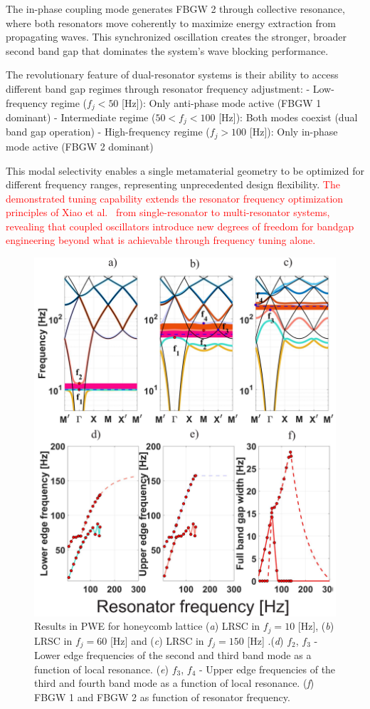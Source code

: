 \documentclass[review,numbers,sort&compress]{elsarticle}
\begin{document}
The in-phase coupling mode generates FBGW 2 through collective resonance, where both resonators move coherently to maximize energy extraction from propagating waves. This synchronized oscillation creates the stronger, broader second band gap that dominates the system's wave blocking performance.

The revolutionary feature of dual-resonator systems is their ability to access different band gap regimes through resonator frequency adjustment:
- Low-frequency regime ($f_j < 50$ [Hz]): Only anti-phase mode active (FBGW 1 dominant)
- Intermediate regime ($50 < f_j < 100$ [Hz]): Both modes coexist (dual band gap operation)
- High-frequency regime ($f_j > 100$ [Hz]): Only in-phase mode active (FBGW 2 dominant)

This modal selectivity enables a single metamaterial geometry to be optimized for different frequency ranges, representing unprecedented design flexibility. \textcolor{red}{The demonstrated tuning capability extends the resonator frequency optimization principles of Xiao et al.~\cite{Xiao_2012} from single-resonator to multi-resonator systems, revealing that coupled oscillators introduce new degrees of freedom for bandgap engineering beyond what is achievable through frequency tuning alone.}
\newpage
\begin{figure}[htb]
	\centering
	\includegraphics[width=.8\textwidth]{2_4_disp_frf_hex.pdf}
	\caption{Results in PWE for honeycomb lattice (\textit{a}) LRSC in $f_j=10$ [Hz], (\textit{b}) LRSC in $f_j=60$ [Hz] and (\textit{c}) LRSC in $f_j=150$ [Hz] .(\textit{d}) $f_2$, $f_3$ - Lower edge frequencies of the second and third band mode as a function of local resonance. (\textit{e}) $f_3$, $f_4$ - Upper edge frequencies of the third and fourth band mode as a function of local resonance. (\textit{f}) FBGW 1 and FBGW 2 as function of resonator frequency. }
	\label{pwe_disp_hex_all_res12}
\end{figure}
\end{document}
